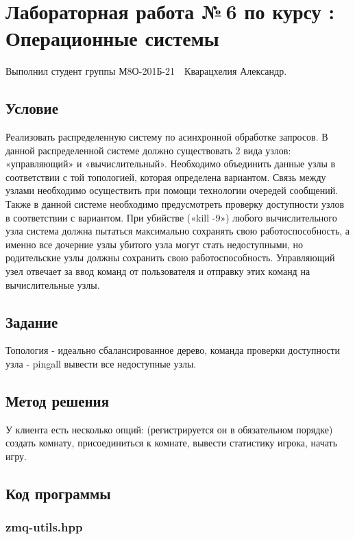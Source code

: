 \documentclass[12pt]{article}
\begin{document}
	
	\section*{\centering Лабораторная работа №\,6 по курсу :\\ Операционные системы}
	
	Выполнил студент группы М8О-201Б-21 \,\, Кварацхелия Александр.
	
	\subsection*{Условие}
	
	Реализовать распределенную систему по асинхронной обработке запросов. В данной
	распределенной системе должно существовать 2 вида узлов: «управляющий» и
	«вычислительный». Необходимо объединить данные узлы в соответствии с той топологией,
	которая определена вариантом. Связь между узлами необходимо осуществить при помощи
	технологии очередей сообщений. Также в данной системе необходимо предусмотреть проверку
	доступности узлов в соответствии с вариантом. При убийстве («kill -9») любого вычислительного
	узла система должна пытаться максимально сохранять свою работоспособность, а именно все
	дочерние узлы убитого узла могут стать недоступными, но родительские узлы должны сохранить
	свою работоспособность.
	Управляющий узел отвечает за ввод команд от пользователя и отправку этих команд на
	вычислительные узлы.
	
	\subsection*{Задание}
	
	Топология - идеально сбалансированное дерево, команда проверки доступности узла - pingall вывести все недоступные узлы.	
	
	\subsection*{Метод решения}
	
	У клиента есть несколько опций: (регистрируется он в обязательном порядке) создать комнату, присоединиться к комнате, вывести статистику игрока, начать игру. 
	
	\subsection*{Код программы}
	
	\subsubsection*{zmq-utils.hpp}
	
\end{document}
